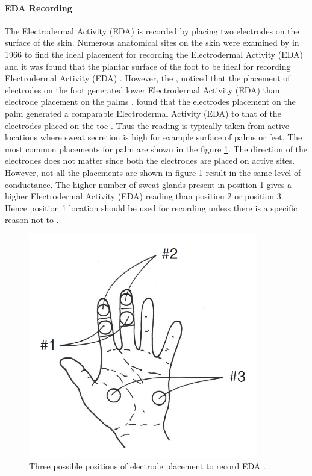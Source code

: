 \paragraph{EDA Recording} The Electrodermal Activity (EDA) is recorded by placing two electrodes on the surface of the skin. Numerous anatomical sites on the skin were examined by \citeauthor{culp_regional_1966} in 1966 to find the ideal placement for recording the Electrodermal Activity (EDA) and it was found that the plantar surface of the foot to be ideal for recording Electrodermal Activity (EDA) \cite{culp_regional_1966}. However, the \citeauthor{van_dooren_emotional_2012}, noticed that the placement of electrodes on the foot generated lower Electrodermal Activity (EDA) than electrode placement on the palms \cite{van_dooren_emotional_2012}. \citeauthor{payne_lapses_2016} found that the electrodes placement on the palm generated a comparable Electrodermal Activity (EDA) to that of the  electrodes placed on the toe \cite{payne_lapses_2016}. Thus the reading is typically taken from active locations where sweat secretion is high for example surface of palms or feet. The most common placements for palm are shown in the figure \ref{fig:eda_electrode_placement}. The direction of the electrodes does not matter since both the electrodes are placed on active sites. However, not all the placements are shown in figure \ref{fig:eda_electrode_placement} result in the same level of conductance. The higher number of sweat glands present in position 1 gives a higher Electrodermal Activity (EDA) reading than position 2 or position 3. Hence position 1 location should be used for recording unless there is a specific reason not to \cite{cacioppo_electrodermal_2016_p_217_243}.

\begin{figure}
    \centering
    \includegraphics[width=100mm]{Figures/eda_electrode_placement.PNG}
    \caption{Three possible positions of electrode placement to record EDA \cite{cacioppo_electrodermal_2016_p_217_243}.}
    \label{fig:eda_electrode_placement}
\end{figure}

